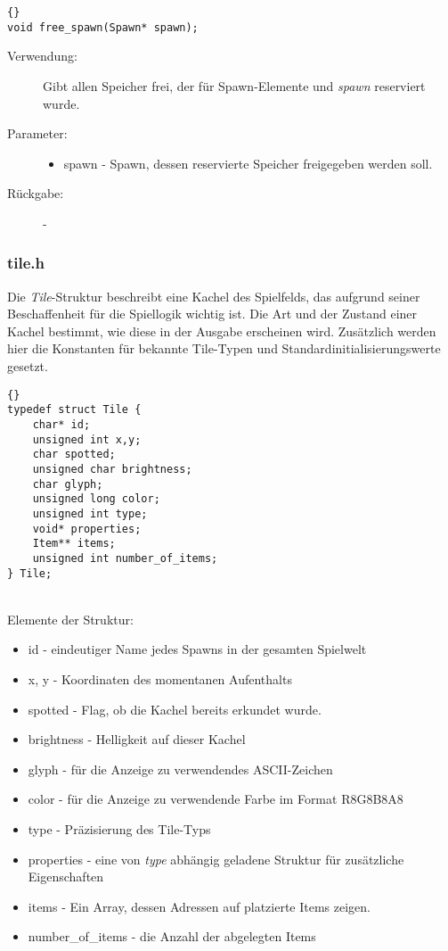 \documentclass[11pt,a4paper,notitlepage]{report}
\begin{document}
		\begin{lstlisting}[caption=free\_spawn]{}
void free_spawn(Spawn* spawn);
		\end{lstlisting}
		
	\begin{description}
		\item[Verwendung:] Gibt allen Speicher frei, der für Spawn-Elemente und \textit{spawn} reserviert wurde.
		\item[Parameter:] \hfill
		\begin{itemize}
			\item spawn - Spawn, dessen reservierte Speicher freigegeben werden soll.
		\end{itemize}
		\item[Rückgabe:] -
	\end{description}
	
	\newpage
	\subsubsection*{tile.h}
Die \textit{Tile}-Struktur beschreibt eine Kachel des Spielfelds, das aufgrund seiner Beschaffenheit für die Spiellogik wichtig ist. Die Art und der Zustand einer Kachel bestimmt, wie diese in der Ausgabe erscheinen wird. Zusätzlich werden hier die Konstanten für bekannte Tile-Typen und Standardinitialisierungswerte gesetzt.

		\begin{lstlisting}[caption=Tile]{}
typedef struct Tile {
	char* id;
	unsigned int x,y;
	char spotted;
	unsigned char brightness;
	char glyph;
	unsigned long color;
	unsigned int type;
	void* properties;
	Item** items;
	unsigned int number_of_items;
} Tile;
		\end{lstlisting} \hspace*{\fill} \\
Elemente der Struktur:
		\begin{itemize}
			\item id - eindeutiger Name jedes Spawns in der gesamten Spielwelt
			\item x, y - Koordinaten des momentanen Aufenthalts
			\item spotted - Flag, ob die Kachel bereits erkundet wurde.
			\item brightness - Helligkeit auf dieser Kachel
			\item glyph - für die Anzeige zu verwendendes ASCII-Zeichen
			\item color - für die Anzeige zu verwendende Farbe im Format R8G8B8A8
			\item type - Präzisierung des Tile-Typs
			\item properties - eine von \textit{type} abhängig geladene Struktur für zusätzliche Eigenschaften
			\item items - Ein Array, dessen Adressen auf platzierte Items zeigen.
			\item number\_of\_items - die Anzahl der abgelegten Items
		\end{itemize}
		
\end{document}

